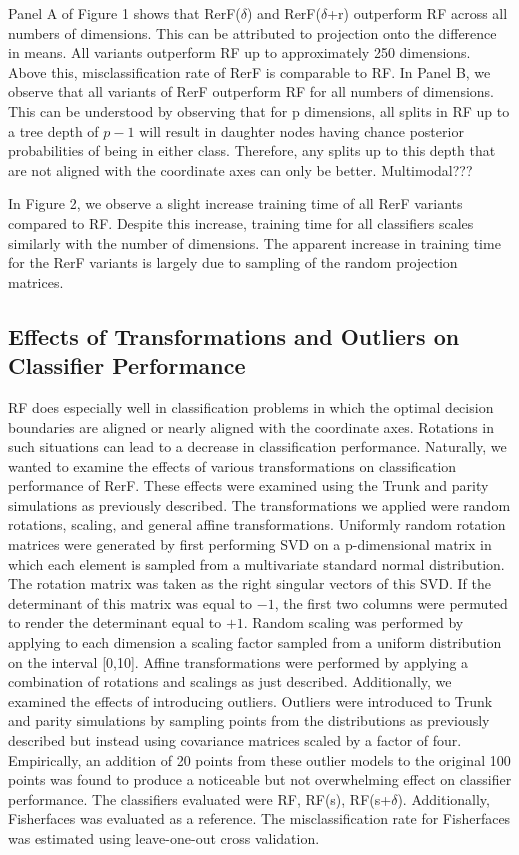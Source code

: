 \documentclass{article} %
\begin{document}
Panel A of Figure 1 shows that RerF($\delta$) and RerF($\delta$+r) outperform RF across all numbers of dimensions. This can be attributed to projection onto the difference in means. All variants outperform RF up to approximately 250 dimensions. Above this, misclassification rate of RerF is comparable to RF. In Panel B, we observe that all variants of RerF outperform RF for all numbers of dimensions. This can be understood by observing that for p dimensions, all splits in RF up to a tree depth of $p - 1$ will result in daughter nodes having chance posterior probabilities of being in either class. Therefore, any splits up to this depth that are not aligned with the coordinate axes can only be better. Multimodal???

In Figure 2, we observe a slight increase training time of all RerF variants compared to RF. Despite this increase, training time for all classifiers scales similarly with the number of dimensions. The apparent increase in training time for the RerF variants is largely due to sampling of the random projection matrices. 


\subsection{Effects of Transformations and Outliers on Classifier Performance}

RF does especially well in classification problems in which the optimal decision boundaries are aligned or nearly aligned with the coordinate axes. Rotations in such situations can lead to a decrease in classification performance. Naturally, we wanted to examine the effects of various transformations on classification performance of RerF. These effects were examined using the Trunk and parity simulations as previously described. The transformations we applied were random rotations, scaling, and general affine transformations. Uniformly random rotation matrices were generated by first performing SVD on a p-dimensional matrix in which each element is sampled from a multivariate standard normal distribution. The rotation matrix was taken as the right singular vectors of this SVD. If the determinant of this matrix was equal to $-1$, the first two columns were permuted to render the determinant equal to $+1$. Random scaling was performed by applying to each dimension a scaling factor sampled from a uniform distribution on the interval [0,10]. Affine transformations were performed by applying a combination of rotations and scalings as just described. Additionally, we examined the effects of introducing outliers. Outliers were introduced to Trunk and parity simulations by sampling points from the distributions as previously described but instead using covariance matrices scaled by a factor of four. Empirically, an addition of 20 points from these outlier models to the original 100 points was found to produce a noticeable but not overwhelming effect on classifier performance. The classifiers evaluated were RF, RF(s), RF(s+$\delta$). Additionally, Fisherfaces was evaluated as a reference. The misclassification rate for Fisherfaces was estimated using leave-one-out cross validation. 
\end{document}
